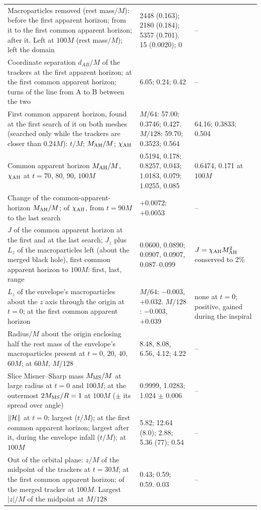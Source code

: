 \begin{table}
\begin{ruledtabular}
\begin{tabular}{p{}p{}p{}}
\raggedright Macroparticles removed (rest mass$/M$): before the first apparent horizon; from it to the first common apparent horizon; after it. Left at $100M$ (rest mass$/M$); left the domain & \raggedright 2448 (0.163); 2180 (0.184); 5357 (0.701). 15 (0.0020); 0 & \raggedright -- \tabularnewline
\raggedright Coordinate separation $d_{AB}/M$ of the trackers at the first apparent horizon; at the first common apparent horizon; turns of the line from A to B between the two & \raggedright 6.05; 0.24; 0.42 & \raggedright -- \tabularnewline
\raggedright First common apparent horizon, found at the first search of it on both meshes (searched only while the trackers are closer than $0.24M$): $t/M$; $M_{\rm AH}/M$; $\chi_{\rm AH}$ & \raggedright $M/64$: 57.00; 0.3746; 0.427. $M/128$: 59.70; 0.3523; 0.564 & \raggedright 64.16; 0.3833; 0.504 \tabularnewline
\raggedright Common apparent horizon $M_{\rm AH}/M$, $\chi_{\rm AH}$ at $t=70$, $80$, $90$, $100M$ & \raggedright 0.5194, 0.178; 0.8257, 0.043; 1.0183, 0.079; 1.0255, 0.085 & \raggedright 0.6474, 0.171 at $100M$ \tabularnewline
\raggedright Change of the common-apparent-horizon $M_{\rm AH}/M$; of $\chi_{\rm AH}$, from $t=90M$ to the last search & \raggedright $+0.0072$; $+0.0053$ & \raggedright -- \tabularnewline
\raggedright $J$ of the common apparent horizon at the first and at the last search; $J_z$ plus $L_z$ of the macroparticles left (about the merged black hole), first common apparent horizon to $100M$: first, last, range & \raggedright 0.0600, 0.0890; 0.0907, 0.0907, 0.087--0.099 & \raggedright $J=\chi_{\rm AH} M_{\rm AH}^2$ conserved to 2\% \tabularnewline
\raggedright $L_z$ of the envelope's macroparticles about the $z$ axis through the origin at $t=0$; at the first common apparent horizon & \raggedright $M/64$: $-0.003$, $+0.032$. $M/128$: $-0.003$, $+0.039$ & \raggedright none at $t=0$; positive, gained during the inspiral \tabularnewline
\raggedright Radius$/M$ about the origin enclosing half the rest mass of the envelope's macroparticles present at $t=0$, $20$, $40$, $60M$; at $60M$, $M/128$ & \raggedright 8.48, 8.08, 6.56, 4.12; 4.22 & \raggedright -- \tabularnewline
\raggedright Slice Misner--Sharp mass $M_{\rm MS}/M$ at large radius at $t=0$ and $100M$; at the outermost $2M_{\rm MS}/R=1$ at $100M$ ($\pm$ its spread over angle) & \raggedright 0.9999, 1.0283; 1.024 $\pm$ 0.006 & \raggedright -- \tabularnewline
\raggedright $\|\mathcal{H}\|$ at $t=0$; largest ($t/M$); at the first common apparent horizon; largest after it, during the envelope infall ($t/M$); at $100M$ & \raggedright 5.82; 12.64 (8.0); 2.88; 5.36 (77); 0.54 & \raggedright -- \tabularnewline
\raggedright Out of the orbital plane: $z/M$ of the midpoint of the trackers at $t=30M$; at the first common apparent horizon; of the merged tracker at $100M$. Largest $|z|/M$ of the midpoint at $M/128$ & \raggedright 0.43; 0.59; 0.59. 0.03 & \raggedright -- \tabularnewline
\end{tabular}
\end{ruledtabular}
\end{table}

